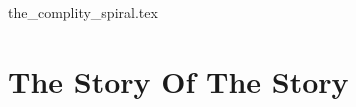 
{the_complity_spiral.tex}
%
%
%
%

%
%
%
%
%
%
%
%
%



%
%
%
%
%
%
%
%
%
%
%
%

\part{The Story Of The Story}


